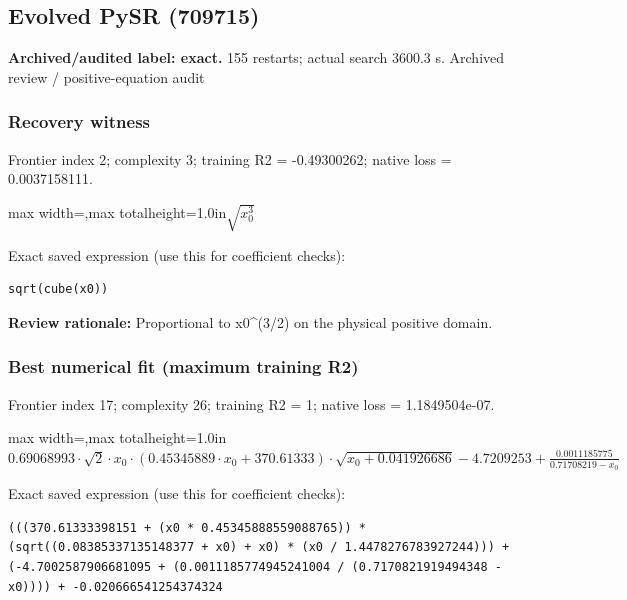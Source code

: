 \documentclass[10pt,letterpaper,landscape]{article}
\begin{document}
\begin{minipage}[t]{0.485\textwidth}
\subsection*{Evolved PySR (709715)}
\textbf{Archived/audited label: exact.} 155 restarts; actual search 3600.3 s.
{\small Archived review / positive-equation audit}
\subsubsection*{Recovery witness}
Frontier index 2; complexity 3; training R2 = -0.49300262; native loss = 0.0037158111.
\begin{center}\begin{adjustbox}{max width=\linewidth,max totalheight=1.0in}$\displaystyle \sqrt{x_{0}^{3}}$\end{adjustbox}\end{center}
{\scriptsize Exact saved expression (use this for coefficient checks):}
\begin{lstlisting}
sqrt(cube(x0))
\end{lstlisting}
{\small\textbf{Review rationale:} Proportional to x0\textasciicircum{}(3/2) on the physical positive domain.}
\subsubsection*{Best numerical fit (maximum training R2)}
Frontier index 17; complexity 26; training R2 = 1; native loss = 1.1849504e-07.
\begin{center}\begin{adjustbox}{max width=\linewidth,max totalheight=1.0in}$\displaystyle 0.69068993 \cdot \sqrt{2} \cdot x_{0} \cdot \left(0.45345889 \cdot x_{0} + 370.61333\right) \cdot \sqrt{x_{0} + 0.041926686} - 4.7209253 + \frac{0.0011185775}{0.71708219 - x_{0}}$\end{adjustbox}\end{center}
{\scriptsize Exact saved expression (use this for coefficient checks):}
\begin{lstlisting}
(((370.61333398151 + (x0 * 0.45345888559088765)) * (sqrt((0.08385337135148377 + x0) + x0) * (x0 / 1.4478276783927244))) + (-4.7002587906681095 + (0.0011185774945241004 / (0.7170821919494348 - x0)))) + -0.020666541254374324
\end{lstlisting}
\end{minipage}
\clearpage{}\label{kepler-10001}
\end{document}
